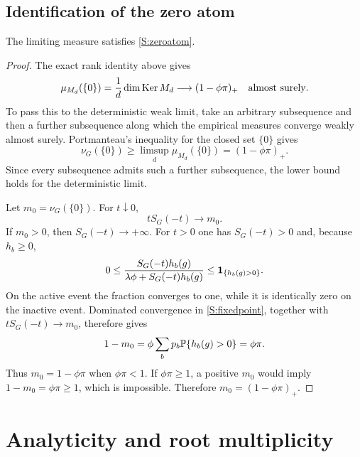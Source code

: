 \subsection{Identification of the zero atom}

\begin{lemma}
\label{S:zero-mass-lemma}
The limiting measure satisfies \eqref{S:zeroatom}.
\end{lemma}

\begin{proof}
The exact rank identity above gives
\begin{equation}
\mu_{M_d}(\{0\})
=
\frac1d\dim\operatorname{Ker} M_d
\longrightarrow(1-\phi\pi)_+
\quad\text{almost surely}.
\end{equation}
To pass this to the deterministic weak limit, take an arbitrary subsequence and then a further
subsequence along which the empirical measures converge weakly almost surely. Portmanteau's
inequality for the closed set $\{0\}$ gives
\begin{equation}
\nu_G(\{0\})
\ge\limsup_d\mu_{M_d}(\{0\})
=(1-\phi\pi)_+.
\end{equation}
Since every subsequence admits such a further subsequence, the lower bound holds for the
deterministic limit.

Let $m_0=\nu_G(\{0\})$. For $t\downarrow0$,
\begin{equation}
tS_G(-t)\longrightarrow m_0.
\end{equation}
If $m_0>0$, then $S_G(-t)\to+\infty$.  For $t>0$ one has
$S_G(-t)>0$ and, because $h_b\ge0$,
\begin{equation}
0\le
\frac{S_G(-t)h_b(g)}{\lambda\phi+S_G(-t)h_b(g)}
\le\mathbf{1}_{\{h_b(g)>0\}}.
\end{equation}
On the active event the fraction converges to one, while it is identically
zero on the inactive event.  Dominated convergence in
\eqref{S:fixedpoint}, together with $tS_G(-t)\to m_0$, therefore gives
\begin{equation}
1-m_0=\phi\sum_bp_b\mathbb{P}\{h_b(g)>0\}=\phi\pi.
\end{equation}
Thus $m_0=1-\phi\pi$ when $\phi\pi<1$. If $\phi\pi\ge1$, a positive $m_0$ would imply $1-m_0=\phi\pi\ge1$, which is impossible. Therefore $m_0=(1-\phi\pi)_+$.
\end{proof}


\section{Analyticity and root multiplicity}


